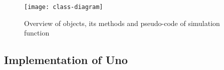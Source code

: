 \begin{figure}[h!]
\caption{Overview of objects, its methods and pseudo-code of simulation function}
\centering
\texttt{[image: class-diagram]}
\label{fig:class-diagram}
\end{figure}

%
%
%
%

%



\subsection{Implementation of Uno}

